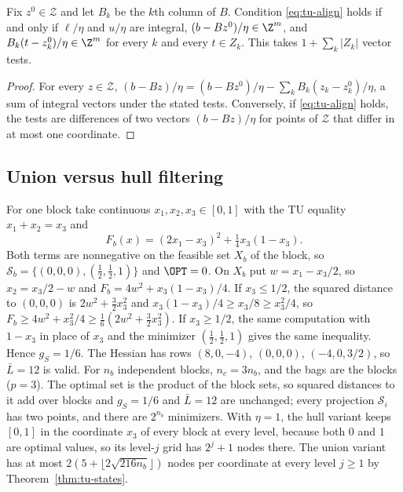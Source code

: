\begin{proposition}\label{prop:tu-align}
Fix $z^0\in\mathcal Z$ and let $B_k$ be the $k$th column of $B$. Condition
\eqref{eq:tu-align} holds if and only if $\ell/\eta$ and $u/\eta$ are integral,
$(b-Bz^0)/\eta\in\Z^m$, and $B_k(t-z^0_k)/\eta\in\Z^m$ for every $k$ and
every $t\in Z_k$. This takes $1+\sum_k\lvert Z_k\rvert$ vector tests.
\end{proposition}

\begin{proof}
For every $z\in\mathcal Z$,
$(b-Bz)/\eta=(b-Bz^0)/\eta-\sum_kB_k(z_k-z^0_k)/\eta$, a sum of integral
vectors under the stated tests. Conversely, if \eqref{eq:tu-align} holds, the
tests are differences of two vectors $(b-Bz)/\eta$ for points of
$\mathcal Z$ that differ in at most one coordinate.
\end{proof}

\subsection{Union versus hull filtering}\label{app:tu-union}

\begin{example}\label{ex:tu-union}
For one block take continuous $x_1,x_2,x_3\in[0,1]$ with the TU equality
$x_1+x_2=x_3$ and
\[
F_b(x)=(2x_1-x_3)^2+\tfrac14x_3(1-x_3).
\]
Both terms are nonnegative on the feasible set $X_b$ of the block, so
$\mathcal S_b=\{(0,0,0),(\tfrac12,\tfrac12,1)\}$ and $\OPT=0$. On $X_b$ put
$w=x_1-x_3/2$, so $x_2=x_3/2-w$ and $F_b=4w^2+x_3(1-x_3)/4$. If $x_3\le1/2$,
the squared distance to $(0,0,0)$ is $2w^2+\frac32x_3^2$ and
$x_3(1-x_3)/4\ge x_3/8\ge x_3^2/4$, so
$F_b\ge4w^2+x_3^2/4\ge\frac16(2w^2+\frac32x_3^2)$. If $x_3\ge1/2$, the same
computation with $1-x_3$ in place of $x_3$ and the minimizer
$(\frac12,\frac12,1)$ gives the same inequality. Hence $g_S=1/6$. The Hessian
has rows $(8,0,-4)$, $(0,0,0)$, $(-4,0,3/2)$, so $\bar L=12$ is valid. For $n_b$
independent blocks, $n_c=3n_b$, and the bags are the blocks ($p=3$). The
optimal set is the product of the block sets, so squared distances to it add
over blocks and $g_S=1/6$ and $\bar L=12$ are unchanged; every projection
$\mathcal S_i$ has two points, and there are $2^{n_b}$ minimizers. With
$\eta=1$, the hull variant keeps $[0,1]$ in the coordinate $x_3$ of every
block at every level, because both $0$ and $1$ are optimal values, so its
level-$j$ grid has $2^j+1$ nodes there. The union variant has at most
$2(5+\lfloor2\sqrt{216n_b}\rfloor)$ nodes per coordinate at every level
$j\ge1$ by Theorem~\ref{thm:tu-states}.
\end{example}

